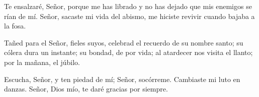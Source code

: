 
 


\begin{psbody}
Te ensalzaré, Señor, porque me has librado 
y no has dejado que mis enemigos se rían de mí. 
Señor, sacaste mi vida del abismo, 
me hiciste revivir cuando bajaba a la fosa. 

Tañed para el Señor, fieles suyos, 
celebrad el recuerdo de su nombre santo; 
su cólera dura un instante; 
su bondad, de por vida; 
al atardecer nos visita el llanto; 
por la mañana, el júbilo. 

Escucha, Señor, y ten piedad de mí; 
Señor, socórreme. 
Cambiaste mi luto en danzas. 
Señor, Dios mío, te daré gracias por siempre. 
\end{psbody}


 


